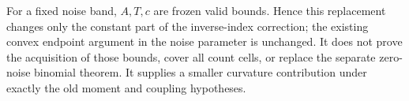 For a fixed noise band, $A,T,c$ are frozen valid bounds. Hence this
replacement changes only the constant part of the inverse-index correction;
the existing convex endpoint argument in the noise parameter is unchanged.
It does not prove the acquisition of those bounds, cover all count cells,
or replace the separate zero-noise binomial theorem. It supplies a smaller
curvature contribution under exactly the old moment and coupling hypotheses.
